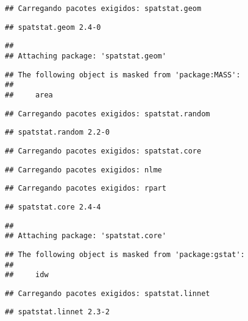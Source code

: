 \documentclass[
]{book}
\theoremstyle{definition}
\theoremstyle{definition}
\theoremstyle{definition}
\theoremstyle{definition}
\theoremstyle{remark}
\begin{document}
\begin{verbatim}
## Carregando pacotes exigidos: spatstat.geom
\end{verbatim}

\begin{verbatim}
## spatstat.geom 2.4-0
\end{verbatim}

\begin{verbatim}
## 
## Attaching package: 'spatstat.geom'
\end{verbatim}

\begin{verbatim}
## The following object is masked from 'package:MASS':
## 
##     area
\end{verbatim}

\begin{verbatim}
## Carregando pacotes exigidos: spatstat.random
\end{verbatim}

\begin{verbatim}
## spatstat.random 2.2-0
\end{verbatim}

\begin{verbatim}
## Carregando pacotes exigidos: spatstat.core
\end{verbatim}

\begin{verbatim}
## Carregando pacotes exigidos: nlme
\end{verbatim}

\begin{verbatim}
## Carregando pacotes exigidos: rpart
\end{verbatim}

\begin{verbatim}
## spatstat.core 2.4-4
\end{verbatim}

\begin{verbatim}
## 
## Attaching package: 'spatstat.core'
\end{verbatim}

\begin{verbatim}
## The following object is masked from 'package:gstat':
## 
##     idw
\end{verbatim}

\begin{verbatim}
## Carregando pacotes exigidos: spatstat.linnet
\end{verbatim}

\begin{verbatim}
## spatstat.linnet 2.3-2
\end{verbatim}
\end{document}

